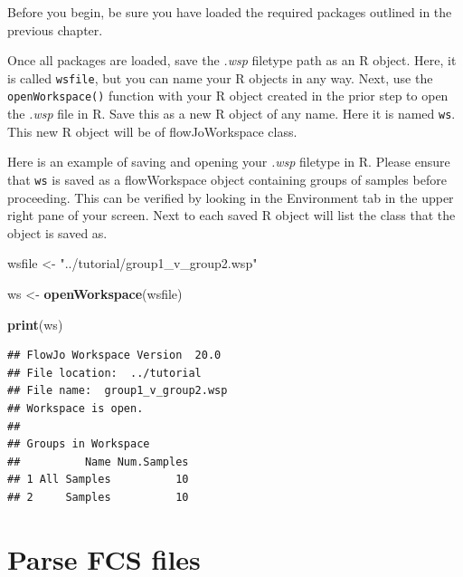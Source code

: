 \documentclass[]{book}
\newenvironment{Shaded}{\begin{snugshade}}{\end{snugshade}}
\newcommand{\KeywordTok}[1]{\textcolor[rgb]{0.13,0.29,0.53}{\textbf{#1}}}
\newcommand{\NormalTok}[1]{#1}
\newcommand{\StringTok}[1]{\textcolor[rgb]{0.31,0.60,0.02}{#1}}
\begin{document}
Before you begin, be sure you have loaded the required packages outlined in the previous chapter.

Once all packages are loaded, save the \emph{.wsp} filetype path as an R object. Here, it is called \texttt{wsfile}, but you can name your R objects in any way. Next, use the \texttt{openWorkspace()} function with your R object created in the prior step to open the \emph{.wsp} file in R. Save this as a new R object of any name. Here it is named \texttt{ws}. This new R object will be of flowJoWorkspace class.

Here is an example of saving and opening your \emph{.wsp} filetype in R. Please ensure that \texttt{ws} is saved as a flowWorkspace object containing groups of samples before proceeding. This can be verified by looking in the Environment tab in the upper right pane of your screen. Next to each saved R object will list the class that the object is saved as.

\begin{Shaded}
\begin{Highlighting}[]
\NormalTok{wsfile <-}\StringTok{ "../tutorial/group1_v_group2.wsp"}
\end{Highlighting}
\end{Shaded}

\begin{Shaded}
\begin{Highlighting}[]
\NormalTok{ws <-}\StringTok{ }\KeywordTok{openWorkspace}\NormalTok{(wsfile)}
\end{Highlighting}
\end{Shaded}

\begin{Shaded}
\begin{Highlighting}[]
\KeywordTok{print}\NormalTok{(ws)}
\end{Highlighting}
\end{Shaded}

\begin{verbatim}
## FlowJo Workspace Version  20.0 
## File location:  ../tutorial 
## File name:  group1_v_group2.wsp 
## Workspace is open. 
## 
## Groups in Workspace
##          Name Num.Samples
## 1 All Samples          10
## 2     Samples          10
\end{verbatim}

\hypertarget{parse-fcs-files}{%
\section{Parse FCS files}\label{parse-fcs-files}}
\end{document}
